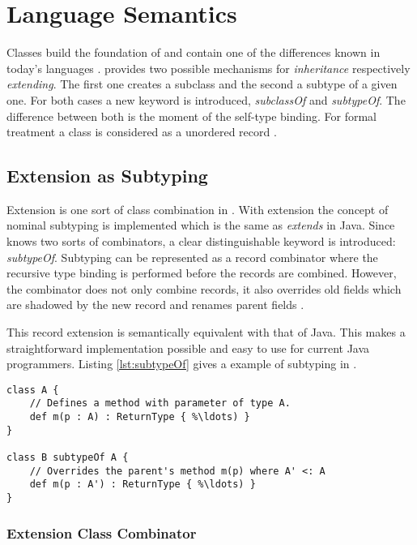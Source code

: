 \chapter{Language Semantics}
Classes build the foundation of \ooplss and contain one of the
differences known in today's languages
. \ooplss provides two possible
mechanisms for \emph{inheritance} respectively \emph{extending}. The
first one creates a subclass and the second a subtype of a given
one. For both cases a new keyword is introduced, \emph{subclassOf}
and \emph{subtypeOf}. The difference between both is the moment of
the self-type binding. For formal treatment a class is considered as a
unordered record \cite{simons_theory_2002-1}.

\section{Extension as Subtyping}
Extension is one sort of class combination in \ooplss. With extension the concept
of nominal subtyping is implemented which is the same as \emph{extends} in Java.
Since \ooplss knows two sorts of combinators, a clear distinguishable keyword is
introduced: \emph{subtypeOf}. Subtyping can be represented as a record combinator
where the recursive type binding is performed before the records are combined.
However, the combinator does not only combine records, it also overrides old
fields which are shadowed by the new record and renames parent
fields \cite{simons_theory_2003-2}.

This record extension is semantically equivalent with that of Java. This
makes a straightforward implementation possible and easy to use for
current Java programmers. Listing \ref{lst:subtypeOf} gives a example
of subtyping in \ooplss.

\begin{lstlisting}[float,language=ooplss,caption=Subtyping in \ooplss,label=lst:subtypeOf]
class A {
	// Defines a method with parameter of type A.
	def m(p : A) : ReturnType { %\ldots) }
}

class B subtypeOf A {
	// Overrides the parent's method m(p) where A' <: A
	def m(p : A') : ReturnType { %\ldots) }
}
\end{lstlisting}


\subsection{Extension Class Combinator}

